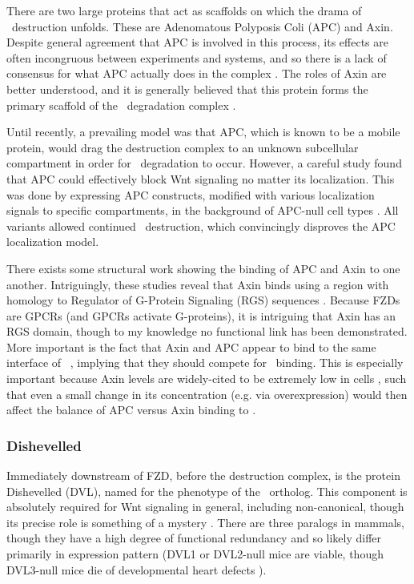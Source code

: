 There are two large proteins that act as scaffolds on which the drama
of \bcat\ destruction unfolds. These are Adenomatous
Polyposis Coli (APC) and Axin. Despite general agreement that APC is involved
in this process, its effects are often incongruous between experiments
and systems, and so there is a lack of consensus
for what APC actually does in the complex \cite{Li2012}. The roles
of Axin are better understood, and it is generally believed that
this protein forms the primary scaffold of the \bcat\ degradation
complex \cite{Roberts2012}.


Until recently, a prevailing model was that APC, which is known to
be a mobile protein, would drag the destruction complex to an unknown
subcellular compartment in order for \bcat\ degradation to occur.
However, a careful study found that APC could
effectively block Wnt signaling no matter its localization. This was
done by expressing APC constructs, modified with various localization
signals to specific compartments, in the background of APC-null cell types
\cite{Roberts2012}. All variants allowed continued \bcat\ destruction,
which convincingly disproves the APC localization model.


There exists some structural work showing the binding of APC and Axin
to one another. Intriguingly, these studies reveal that Axin binds using
a region with homology to Regulator of G-Protein Signaling (RGS)
sequences \cite{Spink2000}. Because FZDs are GPCRs (and GPCRs activate G-proteins), it is
intriguing that Axin has an RGS domain, though to my knowledge no
functional link has been demonstrated. More important is the fact that
Axin and APC appear to bind to the same interface of \bcat\ \cite{MacDonald2009},
implying that they should compete for \bcat\ binding. This is especially
important because Axin levels are widely-cited to be extremely low in cells \cite{Lee2003},
such that even a small change in its concentration (e.g. via overexpression)
would then affect the balance of APC versus Axin binding to \bcat.


\subsubsection{Dishevelled}


Immediately downstream of FZD, before the destruction complex,
is the protein Dishevelled (DVL), named
for the phenotype of the \fly\ ortholog. This component is absolutely required for
Wnt signaling in general, including non-canonical, though its precise
role is something of a mystery \cite{Angers2009,Gao2010}.
There are three paralogs in mammals, though they have a high degree
of functional redundancy and so likely differ primarily in expression pattern
(DVL1 or DVL2-null mice are viable, though
DVL3-null mice die of developmental heart defects \cite{Gao2010}).


